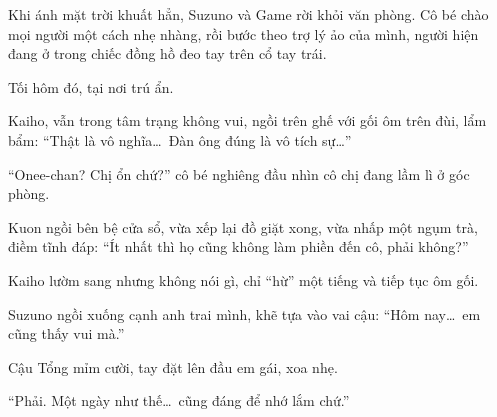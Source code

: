 \documentclass[../main.tex]{subfiles}
\begin{document}
Khi ánh mặt trời khuất hẳn, Suzuno và Game rời khỏi văn phòng. Cô bé chào mọi người một cách nhẹ nhàng, rồi bước theo trợ lý ảo của mình, người hiện đang ở trong chiếc đồng hồ đeo tay trên cổ tay trái.

\ct

Tối hôm đó, tại nơi trú ẩn.

Kaiho, vẫn trong tâm trạng không vui, ngồi trên ghế với gối ôm trên đùi, lẩm bẩm: ``Thật là vô nghĩa\dots\ Đàn ông đúng là vô tích sự\dots''

``Onee-chan? Chị ổn chứ?'' cô bé nghiêng đầu nhìn cô chị đang lầm lì ở góc phòng.

Kuon ngồi bên bệ cửa sổ, vừa xếp lại đồ giặt xong, vừa nhấp một ngụm trà, điềm tĩnh đáp: ``Ít nhất thì họ cũng không làm phiền đến cô, phải không?''

Kaiho lườm sang nhưng không nói gì, chỉ ``hừ'' một tiếng và tiếp tục ôm gối.

Suzuno ngồi xuống cạnh anh trai mình, khẽ tựa vào vai cậu: ``Hôm nay\dots\ em cũng thấy vui mà.''

Cậu Tổng mỉm cười, tay đặt lên đầu em gái, xoa nhẹ.

``Phải. Một ngày như thế\dots\ cũng đáng để nhớ lắm chứ.''
\end{document}
